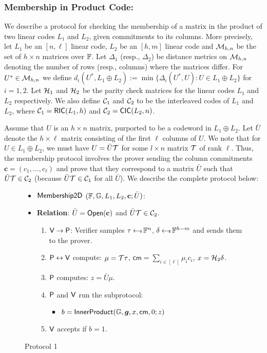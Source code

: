 \subsubsection{Membership in Product Code:}
We describe a protocol for checking the membership of a matrix in the  product of
two linear codes $L_1$ and $L_2$, given commitments to its columns. More
precisely, let $L_1$ be an $[n,\ell]$ linear code, $L_2$ be an $[h,m]$ linear
code and $\mathcal{M}_{h,n}$ be the set of $h\times n$ matrices over $\mathbb{F}$. Let
$\Delta_1$ (resp., $\Delta_2$) be distance metrics on $\mathcal{M}_{h,n}$ denoting the
number of rows (resp., columns) where the matrices differ. For $U^\ast\in
\mathcal{M}_{h,n}$ we define $d_i(U^\ast, L_1\oplus L_2) :=
\min\{\Delta_i(U^\ast,U):U\in L_1\oplus L_2\}$ for $i=1,2$. Let $\mathcal{H}_1$ and $\mathcal{H}_2$ be the parity check matrices for the
linear codes $L_1$ and $L_2$ respectively. We also define $\mathcal{C}_1$ and
$\mathcal{C}_2$ to be the interleaved codes of $L_1$ and $L_2$, where $\mathcal{C}_1=\mathsf{RIC}(L_1,h)$
and $\mathcal{C}_2=\mathsf{CIC}(L_2,n)$.  

Assume that $U$ is an $h\times n$ matrix, purported to be a codeword in
$L_1\oplus L_2$. Let $\bar{U}$ denote the $h\times \ell$ matrix consisting of
the first $\ell$ columns of $U$. We note that for $U\in L_1\oplus L_2$, we must
have $U=\bar{U}\mathcal{T}$ for some $l\times n$ matrix $\mathcal{T}$ of rank $\ell$. Thus, the membership protocol involves the prover sending the column
commitments $\bm{c}=(c_1,\ldots,c_\ell)$ and prove that they correspond to a matrix
$\bar{U}$ such that $\bar{U}\mathcal{T}\in \mathcal{C}_2$ (because $\bar{U}\mathcal{T}\in
\mathcal{C}_1$ for all $\bar{U}$). We describe the complete
protocol below:
\begin{figure}[ht]
\begin{framed}
\begin{itemize}
\item {$\mathsf{Membership2D}$} $(\mathbb{F},\mathbb{G}, L_1, L_2,\mathbf{c}; \bar{U})$:
\item {\bf Relation}: $\bar{U}=\mathsf{Open}(\mathbf{c})$ and $\bar{U}\mathcal{T}\in \mathcal{C}_2$.
\begin{enumerate}[{\rm 1.}]
\item $\mathsf{V}\rightarrow \mathsf{P}$: Verifier samples $\tau\hskip2.3pt{\gets\!\!\mbox{\tiny${\$}$\normalsize}}\,
\mathbb{F}^n$, $\delta\hskip2.3pt{\gets\!\!\mbox{\tiny${\$}$\normalsize}}\, \mathbb{F}^{h-m}$ and sends them to the prover.
\item $\mathsf{P}\leftrightarrow \mathsf{V}$ compute: $\mu=\mathcal{T}\tau$,
$\mathsf{cm} = \sum_{i\in [\ell]} \mu_ic_i$, $x=\mathcal{H}_2\delta$.
\item $\mathsf{P}$ computes: $z=\bar{U}\mu$.
\item $\mathsf{P}$ and $\mathsf{V}$ run the subprotocol:
	\begin{itemize}
	\item $b=\mathsf{InnerProduct}(\mathbb{G},\bm{g},x,\mathsf{cm},0;z)$
	\end{itemize}
\item $\mathsf{V}$ accepts if $b=1$.
\end{enumerate}
\end{itemize}
\end{framed}
\caption{Protocol 1}
\label{fig:protocol1}
\end{figure}

